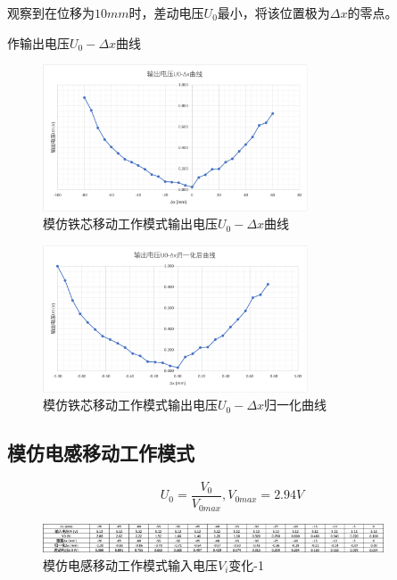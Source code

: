\documentclass{article}
\begin{document}
观察到在位移为$10 mm$时，差动电压$U_0$最小，将该位置极为$\Delta x$的零点。

作输出电压$U_0 - \Delta x$曲线

\begin{figure}[htbp]
   \centering
   \includegraphics[width=0.7\textwidth]{osc-curve1.png}
   \caption{模仿铁芯移动工作模式输出电压$U_0 - \Delta x$曲线}
 \end{figure}

\begin{figure}[htbp]
   \centering
   \includegraphics[width=0.7\textwidth]{osc-curve2.png}
   \caption{模仿铁芯移动工作模式输出电压$U_0 - \Delta x$归一化曲线}
\end{figure}

\newpage

\subsection{模仿电感移动工作模式}
\begin{equation*}
   U_0 = \frac{V_0}{V_{0max}}, V_{0max} = 2.94 V
\end{equation*}

\begin{figure}[htbp]
   \centering
   \includegraphics[width=0.9\textwidth]{osc-3.png}
   \caption{模仿电感移动工作模式输入电压$V_i$变化-1}
 \end{figure}
\end{document}
